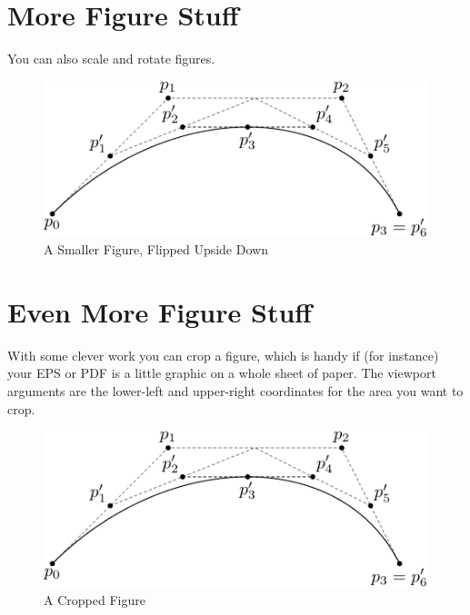 \documentclass[12pt,twoside]{reedthesis}
\theoremstyle{plain}   %
\theoremstyle{definition}
\theoremstyle{remark}
\numberwithin{equation}{section}
\begin{document}
\clearpage %

\section{More Figure Stuff}
You can also scale and rotate figures.
 	\begin{figure}[h!]
	   
	       \centering
	    \includegraphics[scale=0.5,angle=180]{subdivision}
	     \caption{A Smaller Figure, Flipped Upside Down}
	 \label{subd2}
	\end{figure}

\section{Even More Figure Stuff}
With some clever work you can crop a figure, which is handy if (for instance) your EPS or PDF is a little graphic on a whole sheet of paper. The viewport arguments are the lower-left and upper-right coordinates for the area you want to crop.

 	\begin{figure}[h!]
	    	       \centering
	   \includegraphics[clip=true, viewport=.0in .0in 1in 1in]{subdivision}
	    \caption{A Cropped Figure}
	 \label{subd3}
	\end{figure}
	
\end{document}
